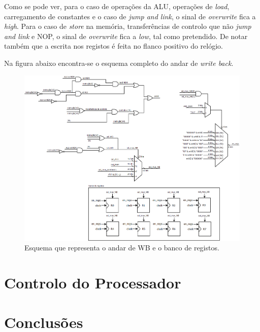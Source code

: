 \documentclass[11pt]{article}
\numberwithin{equation}{section}
\begin{document}
Como se pode ver, para o caso de operações da ALU, operações de \textit{load}, carregamento de constantes e o caso de \textit{jump and link}, o sinal de \textit{overwrite} fica a \textit{high}. Para o caso de \textit{store} na memória, transferências de controlo que não \textit{jump and link} e NOP, o sinal de \textit{overwrite} fica a \textit{low}, tal como pretendido. De notar também que a escrita nos registos é feita no flanco positivo do relógio. 

Na figura abaixo encontra-se o esquema completo do andar de \textit{write back}.

\begin{figure}[h]
	\centering
	\includegraphics[keepaspectratio=true, scale=0.33]{imagens/WB}
	\caption{Esquema que representa o andar de WB e o banco de registos.}
	\vspace{-0.8em}
\end{figure}

\section{Controlo do Processador}


\section{Conclusões}

\pagebreak

\listoftodos
\end{document}
